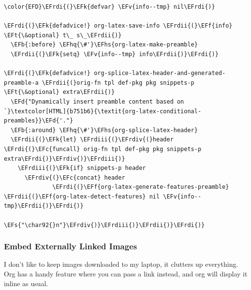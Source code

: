 \documentclass{scrartcl}
\newcommand{\EFk}[1]{\textcolor{EFk}{#1}} %
\newcommand{\EFd}[1]{\textcolor{EFd}{\textit{#1}}} %
\newcommand{\EFt}[1]{\textcolor{EFt}{#1}} %
\newcommand{\EFs}[1]{\textcolor{EFs}{#1}} %
\newcommand{\EFb}[1]{\textcolor{EFb}{#1}} %
\newcommand{\EFc}[1]{\textcolor{EFc}{#1}} %
\newcommand{\EFv}[1]{\textcolor{EFv}{#1}} %
\newcommand{\EFf}[1]{\textcolor{EFf}{#1}} %
\newcommand{\EFhq}[1]{\textcolor{EFhq}{#1}} %
\newcommand{\EFhs}[1]{\textcolor{EFhs}{#1}} %
\newcommand{\EFrdi}[1]{\textcolor{EFrdi}{#1}} %
\newcommand{\EFrdii}[1]{\textcolor{EFrdii}{#1}} %
\newcommand{\EFrdiii}[1]{\textcolor{EFrdiii}{#1}} %
\newcommand{\EFrdiv}[1]{\textcolor{EFrdiv}{#1}} %
\begin{document}
\begin{Code}
\begin{Verbatim}[]
\color{EFD}\EFrdi{(}\EFk{defvar} \EFv{info--tmp} nil\EFrdi{)}

\EFrdi{(}\EFk{defadvice!} org-latex-save-info \EFrdii{(}\EFf{info} \EFt{\&optional} t\_ s\_\EFrdii{)}
  \EFb{:before} \EFhq{\#'}\EFhs{org-latex-make-preamble}
  \EFrdii{(}\EFk{setq} \EFv{info--tmp} info\EFrdii{)}\EFrdi{)}

\EFrdi{(}\EFk{defadvice!} org-splice-latex-header-and-generated-preamble-a \EFrdii{(}orig-fn tpl def-pkg pkg snippets-p \EFt{\&optional} extra\EFrdii{)}
  \EFd{"Dynamically insert preamble content based on `}\textcolor[HTML]{b751b6}{\textit{org-latex-conditional-preambles}}\EFd{'."}
  \EFb{:around} \EFhq{\#'}\EFhs{org-splice-latex-header}
  \EFrdii{(}\EFk{let} \EFrdiii{(}\EFrdiv{(}header \EFrdi{(}\EFc{funcall} orig-fn tpl def-pkg pkg snippets-p extra\EFrdi{)}\EFrdiv{)}\EFrdiii{)}
    \EFrdiii{(}\EFk{if} snippets-p header
      \EFrdiv{(}\EFc{concat} header
              \EFrdi{(}\EFf{org-latex-generate-features-preamble} \EFrdii{(}\EFf{org-latex-detect-features} nil \EFv{info--tmp}\EFrdii{)}\EFrdi{)}
              \EFs{"\char92{}n"}\EFrdiv{)}\EFrdiii{)}\EFrdii{)}\EFrdi{)}
\end{Verbatim}
\end{Code}

\subsubsection{Embed Externally Linked Images}
\label{sec:orgb292aad}
I don't like to keep images downloaded to my laptop, it clutters up everything.
Org has a handy feature where you can pass a link instead, and org will display
it inline as usual.
\end{document}
